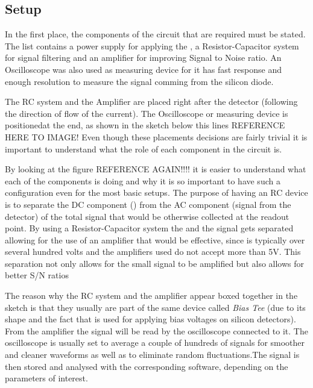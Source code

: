 
\subsection{Setup} 

In the first place, the components of the circuit that are required must be stated. The list contains a power supply for applying the \vias, a Resistor-Capacitor system for signal filtering and an amplifier for improving Signal to Noise ratio. An Oscilloscope was also used as measuring device for it has fast response and enough resolution to measure the signal comming from the silicon diode.

The RC system and the Amplifier are placed right after the detector (following the direction of flow of the current). The Oscilloscope or measuring device is positionedat the end, as shown in the sketch below this lines REFERENCE HERE TO IMAGE! Even though these placements decisions are fairly trivial it is important to understand what the role of each component in the circuit is.

By looking at the figure REFERENCE AGAIN!!!! it is easier to understand what each of the components is doing and why it is so important to have such a configuration even for the most basic setups. The purpose of having an RC device is to separate the DC component (\vias) from the AC component (signal from the detector) of the total signal that would be otherwise collected at the readout point. By using a Resistor-Capacitor system the \vias and the signal gets separated allowing for the use of an amplifier that would be effective, since \vias is typically over several hundred volts and the amplifiers used do not accept more than 5V. This separation not only allows for the small signal to be amplified but also allows for better S/N ratios 

The reason why the RC system and the amplifier appear boxed together in the sketch is that they usually are part of the same device called \textit{Bias Tee} (due to its shape and the fact that is used for applying bias voltages on silicon detectors). From the amplifier the signal will be read by the oscilloscope connected to it. The oscilloscope is usually set to average a couple of hundreds of signals for smoother and cleaner waveforms as well as to eliminate random fluctuations.The signal is then stored and analysed with the corresponding software, depending on the parameters of interest.


